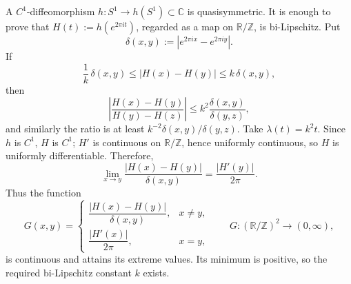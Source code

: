 \documentclass[11pt,a4paper]{article}
\begin{document}
\setcounter{example}{0}\begin{example}
A $C^1$-diffeomorphism $h:S^1\to h(S^1)\subset\mathbb C$ is quasisymmetric. It is enough to prove that $H(t):=h(e^{2\pi it})$, regarded as a map on $\mathbb R/\mathbb Z$, is bi-Lipschitz. Put
\[
\delta(x,y):=|e^{2\pi ix}-e^{2\pi iy}|.
\]
If
\[
\frac1k\,\delta(x,y)\le|H(x)-H(y)|\le k\,\delta(x,y),
\]
then
\[
\left|\frac{H(x)-H(y)}{H(y)-H(z)}\right|
\le k^2\frac{\delta(x,y)}{\delta(y,z)},
\]
and similarly the ratio is at least $k^{-2}\delta(x,y)/\delta(y,z)$. Take $\lambda(t)=k^2t$.
Since $h$ is $C^1$, $H$ is $C^1$; $H'$ is continuous on $\mathbb R/\mathbb Z$, hence uniformly continuous, so $H$ is uniformly differentiable. Therefore,
\[
\lim_{x\to y}\frac{|H(x)-H(y)|}{\delta(x,y)}
=\frac{|H'(y)|}{2\pi}.
\]
Thus the function
\[
G(x,y)=
\begin{cases}
\dfrac{|H(x)-H(y)|}{\delta(x,y)},&x\ne y,\\
\dfrac{|H'(x)|}{2\pi},&x=y,
\end{cases}
\qquad G:(\mathbb R/\mathbb Z)^2\to(0,\infty),
\]
is continuous and attains its extreme values. Its minimum is positive, so the required bi-Lipschitz constant $k$ exists.
\end{example}
\end{document}
